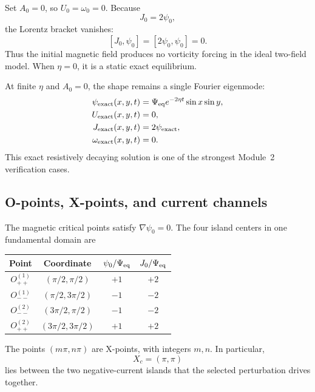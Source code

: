 \documentclass[11pt]{article}
\newcommand{\bracket}[2]{\left[#1,#2\right]}
\begin{document}
Set $A_0=0$, so $U_0=\omega_0=0$. Because
\begin{equation}
J_0=2\psi_0,
\end{equation}
the Lorentz bracket vanishes:
\begin{equation}
\bracket{J_0}{\psi_0}
=\bracket{2\psi_0}{\psi_0}=0.
\end{equation}
Thus the initial magnetic field produces no vorticity forcing in the ideal two-field model. When $\eta=0$, it is a static exact equilibrium.

At finite $\eta$ and $A_0=0$, the shape remains a single Fourier eigenmode:
\begin{align}
\psi_{\rm exact}(x,y,t)
&=\Psi_{\rm eq}e^{-2\eta t}\sin x\sin y,\\
U_{\rm exact}(x,y,t)&=0,\\
J_{\rm exact}(x,y,t)&=2\psi_{\rm exact},\\
\omega_{\rm exact}(x,y,t)&=0.
\label{eq:exactdecay}
\end{align}
This exact resistively decaying solution is one of the strongest Module~2 verification cases.

\subsection{O-points, X-points, and current channels}

The magnetic critical points satisfy $\nabla\psi_0=0$. The four island centers in one fundamental domain are
\begin{center}
\begin{tabular}{cccc}
\toprule
Point & Coordinate & $\psi_0/\Psi_{\rm eq}$ & $J_0/\Psi_{\rm eq}$ \\
\midrule
$O_{++}^{(1)}$ & $(\pi/2,\pi/2)$ & $+1$ & $+2$ \\
$O_{--}^{(1)}$ & $(\pi/2,3\pi/2)$ & $-1$ & $-2$ \\
$O_{--}^{(2)}$ & $(3\pi/2,\pi/2)$ & $-1$ & $-2$ \\
$O_{++}^{(2)}$ & $(3\pi/2,3\pi/2)$ & $+1$ & $+2$ \\
\bottomrule
\end{tabular}
\end{center}
The points $(m\pi,n\pi)$ are X-points, with integers $m,n$. In particular,
\begin{equation}
X_c=(\pi,\pi)
\end{equation}
lies between the two negative-current islands that the selected perturbation drives together.
\end{document}
